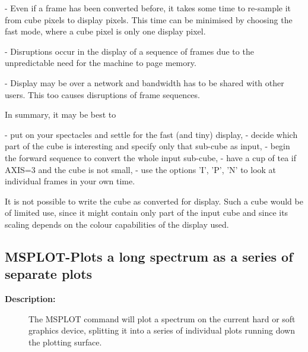 \begin{description}
\begin{description}
\begin{terminalv}
   -  Even if a frame has been converted before, it takes some time
      to re-sample it from cube pixels to display pixels. This time
      can be minimised by choosing the fast mode, where a cube pixel
      is only one display pixel.

   -  Disruptions occur in the display of a sequence of frames due to
      the unpredictable need for the machine to page memory.

   -  Display may be over a network and bandwidth has to be shared
      with other users. This too causes disruptions of frame
      sequences.

   In summary, it may be best to

   -  put on your spectacles and settle for the fast (and tiny)
      display,
   -  decide which part of the cube is interesting and specify
      only that sub-cube as input,
   -  begin the forward sequence to convert the whole input sub-cube,
   -  have a cup of tea if AXIS=3 and the cube is not small,
   -  use the options 'I', 'P', 'N' to look at individual frames in
      your own time.

   It is not possible to write the cube as converted for display.
   Such a cube would be of limited use, since it might contain only
   part of the input cube and since its scaling depends on the colour
   capabilities of the display used.
\end{terminalv}
\end{description}
\subsection{MSPLOT-\label{MSPLOT}Plots a long spectrum as a series of separate plots}
\begin{description}

\item [\textbf{Description:}]
 The MSPLOT command will plot a spectrum on the current hard or soft
 graphics device, splitting it into a series of individual plots running
 down the plotting surface.


\end{description}
\end{description}
